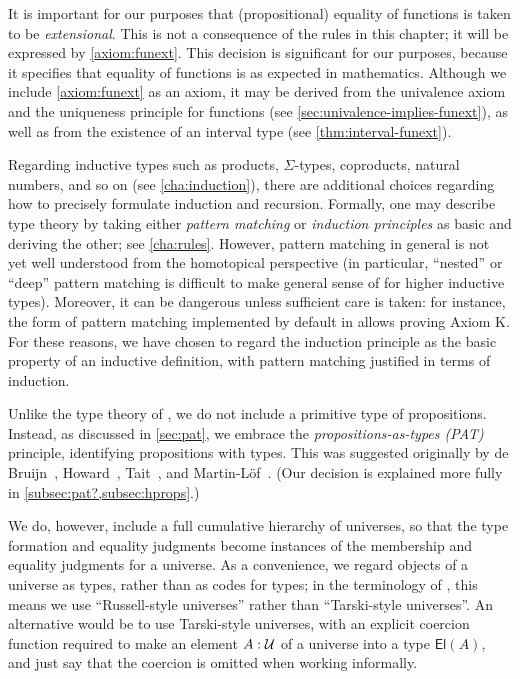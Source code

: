 It is important for our purposes that (propositional) equality of functions is taken to be \emph{extensional}.
This is not a consequence of the rules in this chapter; it will be expressed by \autoref{axiom:funext}.
%
This decision is significant for our purposes, because it specifies that equality of functions is as expected in mathematics.  Although we include \autoref{axiom:funext} as an axiom, it may be derived from the univalence axiom and the uniqueness principle for functions (see \autoref{sec:univalence-implies-funext}), as well as from the existence of an interval type (see \autoref{thm:interval-funext}).

Regarding inductive types such as products, $\Sigma$-types, coproducts, natural numbers, and so on (see \autoref{cha:induction}), there are additional choices regarding how to precisely formulate induction and recursion.
%
Formally, one may describe type theory by taking either \emph{pattern matching} or \emph{induction principles} as basic and deriving the other; see \autoref{cha:rules}.
However, pattern matching in general is not yet well understood from the homotopical perspective (in particular, ``nested'' or ``deep'' pattern matching is difficult to make general sense of for higher inductive types).
Moreover, it can be dangerous unless sufficient care is taken: for instance, the form of pattern matching implemented by default in \Agda
{}%
allows proving Axiom K.
%
For these reasons, we have chosen to regard the induction principle as the basic property of an inductive definition, with pattern matching justified in terms of induction.

%
Unlike the type theory of \Coq, we do not include a primitive type of propositions.  Instead, as discussed in \autoref{sec:pat}, we embrace 
the \emph{propositions-as-types (PAT)} principle, identifying propositions with types.
This was suggested originally by de Bruijn~\cite{deBruijn-1973}, Howard~\cite{howard:pat}, Tait~\cite{Tait-1968}, and Martin-L\"{o}f~\cite{Martin-Lof-1972}.
(Our decision is explained more fully in \autoref{subsec:pat?,subsec:hprops}.)

We do, however, include a full cumulative hierarchy of universes, so that the type formation and equality judgments become instances of the membership and equality judgments for a universe.
As a convenience, we regard objects of a universe as types, rather than as codes for types; in the terminology of \cite{martin-lof:bibliopolis}, this means we use ``Russell-style universes'' rather than ``Tarski-style universes''.
%
%
An alternative would be to use Tarski-style universes, with an explicit coercion function required to make an element $A:\mathcal{U}$ of a universe into a type $\mathsf{El}(A)$, and just say that the coercion is omitted when working informally.


